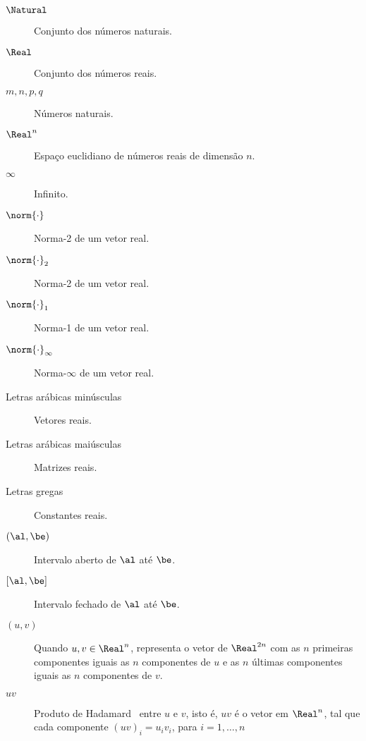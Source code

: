 
\begin{description}

	    \item[$\Natural$] Conjunto dos números naturais.

    \item[$\Real$] Conjunto dos números reais.

    \item[$m, n, p, q$] Números naturais.

    \item[$\Real^n$] Espaço euclidiano de  números reais de dimensão $n$.

    \item[$\infty$] Infinito.

    
    \item[$\norm{\cdot}$] Norma-2 de um vetor real.

    \item[$\norm{\cdot}_{2}$] Norma-2 de um vetor real.

    \item[$\norm{\cdot}_{1}$] Norma-1 de um vetor real.

    \item[$\norm{\cdot}_{\infty}$] Norma-$\infty$ de um vetor real.

     \item[Letras arábicas minúsculas] Vetores reais.

    \item[Letras arábicas maiúsculas] Matrizes reais.

    \item[Letras gregas] Constantes reais.



    \item[$(\al, \be)$] Intervalo aberto de $\al$ até $\be$.

    \item[{$[\al, \be]$}] Intervalo fechado de $\al$ até $\be$.

    \item[$(u,v)$] Quando $u, v\in\Real^n$, representa o vetor de $\Real^{2n}$ com as $n$ primeiras componentes iguais as $n$ componentes de  $u$ e  as $n$ últimas componentes iguais as $n$ componentes de $v$.

    \item[$uv$]  Produto de Hadamard~\cite[p.~455]{Horn:1985tf} entre $u$ e $v$, 
isto é, $uv$ é o vetor em $\Real^n$, tal que cada componente  $(uv)_i  = u_iv_i$, para $i=1,\ldots,n$


\end{description}
